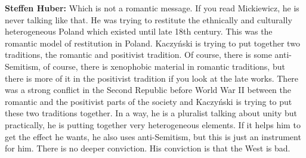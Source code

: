 \textbf{Steffen Huber:} Which is not a romantic message. If you read Mickiewicz, he is never talking like that. He was trying to restitute the ethnically and culturally heterogeneous Poland which existed until late 18th century. This was the romantic model of restitution in Poland. Kaczyński is trying to put together two traditions, the romantic and positivist tradition. Of course, there is some anti-Semitism, of course, there is xenophobic material in romantic traditions, but there is more of it in the positivist tradition if you look at the late works. There was a strong conflict in the Second Republic before World War II between the romantic and the positivist parts of the society and Kaczyński is trying to put these two traditions together. In a way, he is a pluralist talking about unity but practically, he is putting together very heterogeneous elements. If it helps him to get the effect he wants, he also uses anti-Semitism, but this is just an instrument for him. There is no deeper conviction. His conviction is that the West is bad. 